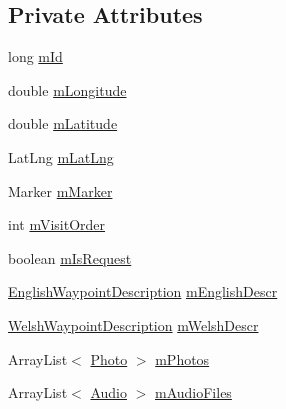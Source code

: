 \subsection*{Private Attributes}
\begin{DoxyCompactItemize}
\item 
long \hyperlink{classuk_1_1ac_1_1swan_1_1digitaltrails_1_1components_1_1_waypoint_a5cf332ec470f69a083b25514bb5a7b3f}{m\+Id}
\item 
double \hyperlink{classuk_1_1ac_1_1swan_1_1digitaltrails_1_1components_1_1_waypoint_af687be1d3a7e681a0d9e61dd4361c6ab}{m\+Longitude}
\item 
double \hyperlink{classuk_1_1ac_1_1swan_1_1digitaltrails_1_1components_1_1_waypoint_a56d8f162b820ec3701151360ebf795be}{m\+Latitude}
\item 
Lat\+Lng \hyperlink{classuk_1_1ac_1_1swan_1_1digitaltrails_1_1components_1_1_waypoint_a9ef9fab5658b853179b30801b978b2a0}{m\+Lat\+Lng}
\item 
Marker \hyperlink{classuk_1_1ac_1_1swan_1_1digitaltrails_1_1components_1_1_waypoint_a90232a0d2fec40f5ae645534db1ad847}{m\+Marker}
\item 
int \hyperlink{classuk_1_1ac_1_1swan_1_1digitaltrails_1_1components_1_1_waypoint_a2c9299a216e4c3534cef9d9f1786ffcb}{m\+Visit\+Order}
\item 
boolean \hyperlink{classuk_1_1ac_1_1swan_1_1digitaltrails_1_1components_1_1_waypoint_a0a3e49d149761e3eee23663d2b614602}{m\+Is\+Request}
\item 
\hyperlink{classuk_1_1ac_1_1swan_1_1digitaltrails_1_1components_1_1_english_waypoint_description}{English\+Waypoint\+Description} \hyperlink{classuk_1_1ac_1_1swan_1_1digitaltrails_1_1components_1_1_waypoint_adf5dc8bb9594c84ca2d279b48d268b9d}{m\+English\+Descr}
\item 
\hyperlink{classuk_1_1ac_1_1swan_1_1digitaltrails_1_1components_1_1_welsh_waypoint_description}{Welsh\+Waypoint\+Description} \hyperlink{classuk_1_1ac_1_1swan_1_1digitaltrails_1_1components_1_1_waypoint_a2f719ce0aad16f15f872cd786647eaca}{m\+Welsh\+Descr}
\item 
Array\+List$<$ \hyperlink{classuk_1_1ac_1_1swan_1_1digitaltrails_1_1components_1_1_photo}{Photo} $>$ \hyperlink{classuk_1_1ac_1_1swan_1_1digitaltrails_1_1components_1_1_waypoint_a2e68c6b5cb4a52d561f354960c188d9b}{m\+Photos}
\item 
Array\+List$<$ \hyperlink{classuk_1_1ac_1_1swan_1_1digitaltrails_1_1components_1_1_audio}{Audio} $>$ \hyperlink{classuk_1_1ac_1_1swan_1_1digitaltrails_1_1components_1_1_waypoint_af5d8a14ef07f5fac6be0895741d7041c}{m\+Audio\+Files}

\end{DoxyCompactItemize}
